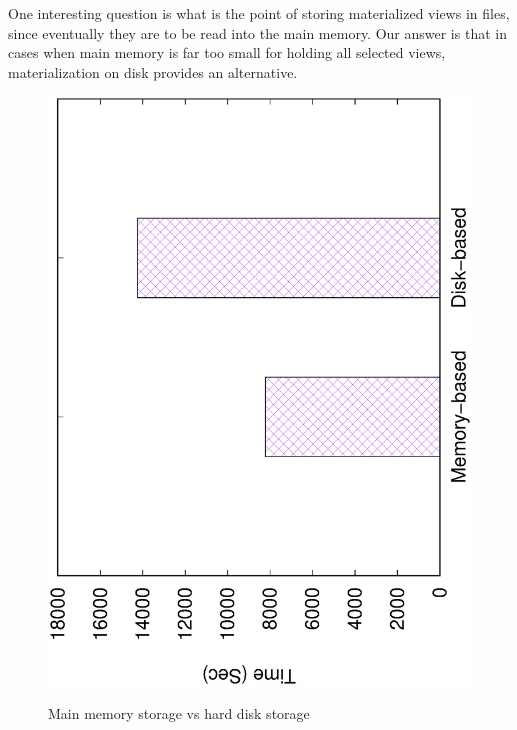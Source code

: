 	One interesting question is what is the point of storing materialized views in files, since eventually they are to be read into the main memory. Our answer is that in cases when main memory is far too small for holding all selected views, materialization on disk provides an alternative.
	
	\begin{figure}[H]
		\centering
		\includegraphics[scale=0.5, angle=270]{plot/disk.eps}
		\label{fig:disk}
		\caption{Main memory storage vs hard disk storage}
	\end{figure}
	

